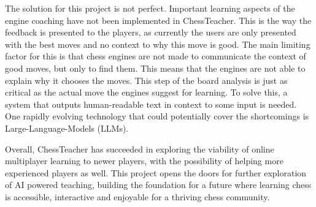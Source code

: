 The solution for this project is not perfect.
Important learning aspects of the engine coaching have not been implemented in ChessTeacher.
This is the way the feedback is presented to the players, as currently the users are only presented with the best moves
and no context to why this move is good.
The main limiting factor for this is that chess engines are not made to communicate the context of good moves, but only
to find them.
This means that the engines are not able to explain why it chooses the moves.
This step of the board analysis is just as critical as the actual move the engines suggest for learning.
To solve this, a system that outputs human-readable text in context to some input is needed.
One rapidly evolving technology that could potentially cover the shortcomings is Large-Language-Models (LLMs).

Overall, ChessTeacher has succeeded in exploring the viability of online multiplayer learning to newer players,
with the possibility of helping more experienced players as well.
This project opens the doors for further exploration of AI powered teaching, building the foundation for a future
where learning chess is accessible, interactive and enjoyable for a thriving chess community.
